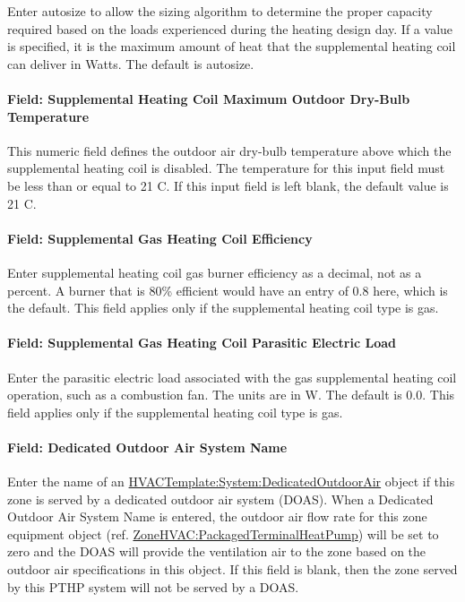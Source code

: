 Enter autosize to allow the sizing algorithm to determine the proper capacity required based on the loads experienced during the heating design day. If a value is specified, it is the maximum amount of heat that the supplemental heating coil can deliver in Watts. The default is autosize.

\paragraph{Field: Supplemental Heating Coil Maximum Outdoor Dry-Bulb Temperature}\label{field-supplemental-heating-coil-maximum-outdoor-dry-bulb-temperature}

This numeric field defines the outdoor air dry-bulb temperature above which the supplemental heating coil is disabled. The temperature for this input field must be less than or equal to 21 C. If this input field is left blank, the default value is 21 C.

\paragraph{Field: Supplemental Gas Heating Coil Efficiency}\label{field-supplemental-gas-heating-coil-efficiency}

Enter supplemental heating coil gas burner efficiency as a decimal, not as a percent. A burner that is 80\% efficient would have an entry of 0.8 here, which is the default. This field applies only if the supplemental heating coil type is gas.

\paragraph{Field: Supplemental Gas Heating Coil Parasitic Electric Load}\label{field-supplemental-gas-heating-coil-parasitic-electric-load}

Enter the parasitic electric load associated with the gas supplemental heating coil operation, such as a combustion fan. The units are in W. The default is 0.0. This field applies only if the supplemental heating coil type is gas.

\paragraph{Field: Dedicated Outdoor Air System Name}\label{field-dedicated-outdoor-air-system-name-3}

Enter the name of an \hyperref[hvactemplatesystemdedicatedoutdoorair]{HVACTemplate:System:DedicatedOutdoorAir} object if this zone is served by a dedicated outdoor air system (DOAS). When a Dedicated Outdoor Air System Name is entered, the outdoor air flow rate for this zone equipment object (ref. \hyperref[zonehvacpackagedterminalheatpump]{ZoneHVAC:PackagedTerminalHeatPump}) will be set to zero and the DOAS will provide the ventilation air to the zone based on the outdoor air specifications in this object. If this field is blank, then the zone served by this PTHP system will not be served by a DOAS.

